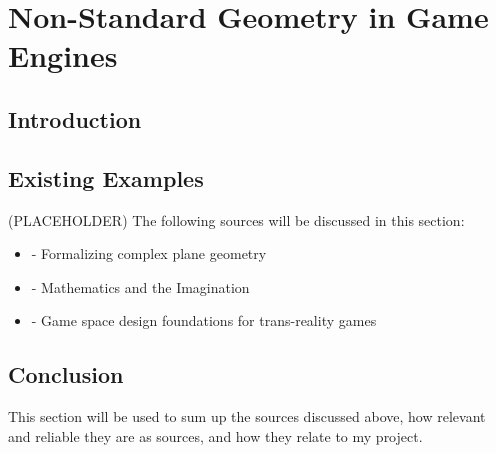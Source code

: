 \section{Non-Standard Geometry in Game Engines}
\label{lr:ne}

\begin{multicols*}{2}
	\subsection{Introduction}
	\label{lr:ne:intro}
	
	\subsection{Existing Examples}
	\label{lr:ne:existing}
		(PLACEHOLDER) The following sources will be discussed in this section:
		\begin{itemize}
			\item \cite{Maric2014} - Formalizing complex plane geometry
			\item \cite{Turner2009} - Mathematics and the Imagination
			\item \cite{Lindley2005} - Game space design foundations for trans-reality games
		\end{itemize}
		
	\subsection{Conclusion}
	\label{lr:ne:conclusion}
		This section will be used to sum up the sources discussed above, how relevant and reliable they are as sources, and how they relate to my project.
		
\end{multicols*}
